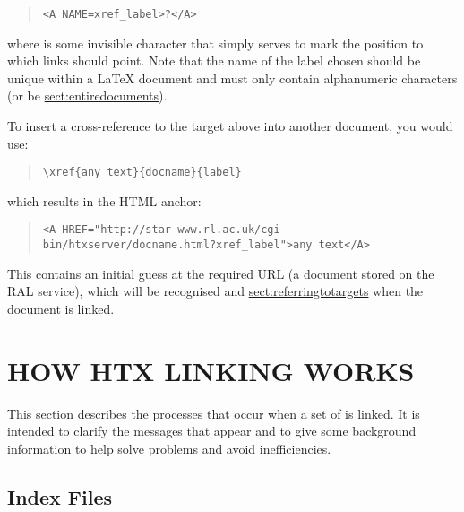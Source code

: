 \begin{quote}
\begin{verbatim}
<A NAME=xref_label>?</A>
\end{verbatim}
\end{quote}

where  is some invisible character that simply serves to mark
the position to which links should point. Note that the name of the
label chosen should be unique within a \mbox{\LaTeX} document and must
only contain alphanumeric characters (or be \hyperref{blank}{blank --
see \S}{}{sect:entiredocuments}).

To insert a cross-reference to the target above into another document,
you would use:

\begin{quote}
\begin{verbatim}
\xref{any text}{docname}{label}
\end{verbatim}
\end{quote}

which results in the HTML anchor:

\begin{quote}
\begin{verbatim}
<A HREF="http://star-www.rl.ac.uk/cgi-bin/htxserver/docname.html?xref_label">any text</A>
\end{verbatim}
\end{quote}

This contains an initial guess at the required URL (a document stored on the
RAL service), which will be recognised and 
\hyperref{modified as necessary}{modified as necessary (see \S}{)}{sect:referringtotargets} when the
document is linked.

\section{\label{sect:howlinkingworks}HOW HTX LINKING WORKS}

This section describes the processes that occur when a set of
 is linked. It is intended to clarify the
messages that appear and to give some background information to help
solve problems and avoid inefficiencies.

\subsection{\label{sect:indexfiles}Index Files}

